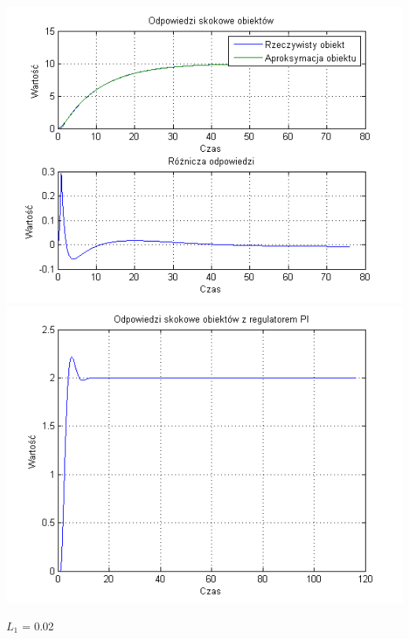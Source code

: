 \documentclass[10pt,a4paper]{article}
\begin{document}
\begin{center}
\includegraphics[scale=1]{images/jeden/skrypt_207.png}\\
\includegraphics[scale=1]{images/jeden/skrypt_208.png}\\
\end{center}
\newpage
$L_1$ = 0.02
\end{document}
